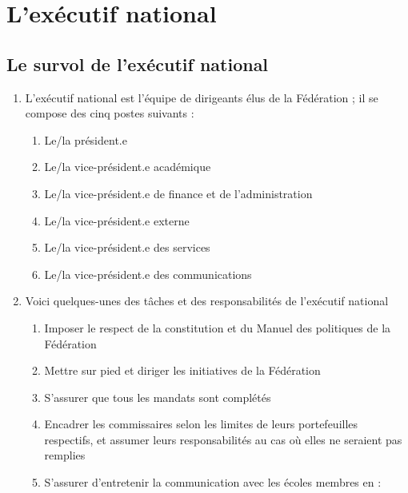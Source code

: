 \section{L'exécutif national}
\label{l-executif-national}

\subsection{Le survol de l'exécutif national}
\label{le-survol-de-l-executif-national}

\begin{enumerate}
 \item
  L'exécutif national est l'équipe de dirigeants élus de la Fédération ; il se compose des cinq postes suivants :
  \begin{enumerate}
   \item
    Le/la président.e
   \item
    Le/la vice-président.e académique
   \item
    Le/la vice-président.e de finance et de l'administration
   \item
    Le/la vice-président.e externe
   \item
    Le/la vice-président.e des services
   \item
    Le/la vice-président.e des communications
  \end{enumerate}
 \item
  Voici quelques-unes des tâches et des responsabilités de l'exécutif national

  \begin{enumerate}
   \item
    Imposer le respect de la constitution et du Manuel des politiques de la Fédération
   \item
    Mettre sur pied et diriger les initiatives de la Fédération
   \item
    S'assurer que tous les mandats sont complétés
   \item
    Encadrer les commissaires selon les limites de leurs portefeuilles respectifs, et assumer leurs responsabilités au cas où elles ne seraient pas remplies
   \item
    S'assurer d'entretenir la communication avec les écoles membres en :


\end{enumerate}
\end{enumerate}
